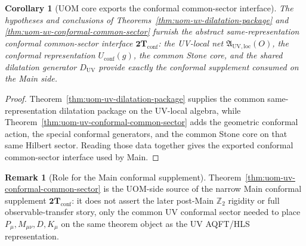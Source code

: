 \documentclass[10pt]{article}
\theoremstyle{definition}
\newtheorem{remark}{Remark}[section]
\theoremstyle{plain}
\newtheorem{corollary}{Corollary}[section]
\begin{document}
\begin{corollary}[UOM core exports the conformal common-sector interface]
\label{cor:uom-core-implies-2T-conf}
The hypotheses and conclusions of
Theorems~\ref{thm:uom-uv-dilatation-package} and
\ref{thm:uom-uv-conformal-common-sector} furnish the abstract
same-representation conformal common-sector interface
\(\mathbf{2T}_{\mathrm{conf}}\): the UV-local net
\(\mathfrak A_{\mathrm{UV,loc}}(O)\), the conformal representation
\(U_{\mathrm{conf}}(g)\), the common Stone core, and the shared
dilatation generator \(D_{\mathrm{UV}}\) provide exactly the conformal
supplement consumed on the Main side.
\end{corollary}

\begin{proof}
Theorem~\ref{thm:uom-uv-dilatation-package} supplies the common
same-representation dilatation package on the UV-local algebra, while
Theorem~\ref{thm:uom-uv-conformal-common-sector} adds the geometric
conformal action, the special conformal generators, and the common
Stone core on that same Hilbert sector.  Reading those data together
gives the exported conformal common-sector interface used by Main.
\end{proof}

\begin{remark}[Role for the Main conformal supplement]
\label{rem:uom-uv-conformal-common-sector-role}
Theorem~\ref{thm:uom-uv-conformal-common-sector} is the UOM-side source
of the narrow Main conformal supplement \(\mathbf{2T}_{\mathrm{conf}}\):
it does not assert the later post-Main \(\mathbb Z_2\) rigidity or full
observable-transfer story, only the common UV conformal sector needed to
place \(P_\mu,M_{\mu\nu},D,K_\mu\) on the same theorem object as the
UV AQFT/HLS representation.
\end{remark}

\printbibliography
\end{document}
